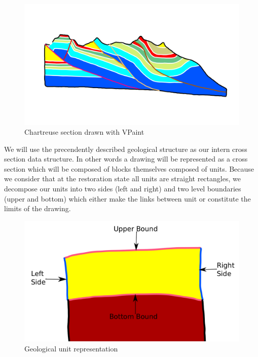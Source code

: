 \documentclass[12pt, a4paper]{report} %
\begin{document}
 \begin{figure}[H]
	\centering
	\includegraphics[scale=0.5]{chartreusevpaint.png}
	\caption{Chartreuse section drawn with VPaint}
\end{figure}

We will use the precendently described geological structure as our intern cross section data structure. In other words a drawing will be represented as a cross section which will be composed of blocks themselves composed of units. Because we consider that at the restoration state all units are straight rectangles, we decompose our units into two sides (left and right) and two level boundaries (upper and bottom) which either make the links between unit or constitute the limits of the drawing. 

 \begin{figure}[H]
	\centering
	\includegraphics[scale=0.3]{unitDescriptionEdit.png}
	\caption{Geological unit representation}
\end{figure}
\end{document}
